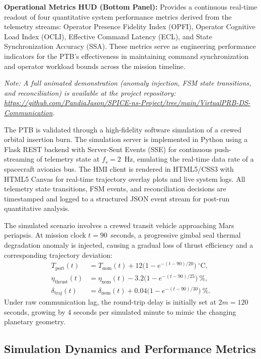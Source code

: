 \documentclass[ASNA,twocolumn]{USG}
\begin{document}
\textbf{Operational Metrics HUD (Bottom Panel):} Provides a continuous real-time readout
of four quantitative system performance metrics derived from the telemetry streams:
Operator Presence Fidelity Index (OPFI), Operator Cognitive Load Index (OCLI),
Effective Command Latency (ECL), and State Synchronization Accuracy (SSA).
These metrics serve as engineering performance indicators for the PTB's effectiveness in
maintaining command synchronization and operator workload bounds across the mission timeline.

\textit{Note: A full animated demonstration (anomaly injection, FSM state transitions, and
reconciliation) is available at the project repository:
\url{https://github.com/PandiaJason/SPICE-ns-Project/tree/main/VirtualPRB-DS-Communication}.}

The PTB is validated through a high-fidelity software simulation of a crewed orbital insertion
burn. The simulation server is implemented in Python using a Flask REST backend with Server-Sent
Events (SSE) for continuous push-streaming of telemetry state at \(f_s = 2\)~Hz, emulating the
real-time data rate of a spacecraft avionics bus. The HMI client is rendered in HTML5/CSS3 with
HTML5 Canvas for real-time trajectory overlay plots and live system logs. All telemetry state
transitions, FSM events, and reconciliation decisions are timestamped and logged to a structured
JSON event stream for post-run quantitative analysis.

The simulated scenario involves a crewed transit vehicle approaching Mars periapsis. At mission clock
\(t = 90\)~seconds, a progressive gimbal seal thermal degradation anomaly is injected, causing a
gradual loss of thrust efficiency and a corresponding trajectory deviation:
\begin{align}
  T_{\text{port}}(t) &= T_{\text{nom}}(t) + 12\bigl(1 - e^{-(t-90)/20}\bigr)~^{\circ}\text{C}, \\
  \eta_{\text{thrust}}(t) &= \eta_{\text{nom}}(t) - 3.2\bigl(1 - e^{-(t-90)/25}\bigr)~\%, \\
  \delta_{\text{traj}}(t) &= \delta_{\text{nom}}(t) + 0.04\bigl(1 - e^{-(t-90)/30}\bigr)~\%.
\end{align}
Under raw communication lag, the round-trip delay is initially set at \(2m = 120\) seconds, growing
by 4 seconds per simulated minute to mimic the changing planetary geometry.

\subsection{Simulation Dynamics and Performance Metrics}
\end{document}
